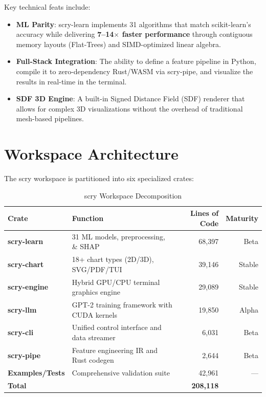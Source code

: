 \documentclass[11pt,a4paper]{article}
\begin{document}
Key technical feats include:
\begin{itemize}
    \item \textbf{ML Parity}: scry-learn implements 31 algorithms that match scikit-learn's accuracy while delivering \textbf{7--14$\times$ faster performance} through contiguous memory layouts (Flat-Trees) and SIMD-optimized linear algebra.
    \item \textbf{Full-Stack Integration}: The ability to define a feature pipeline in Python, compile it to zero-dependency Rust/WASM via scry-pipe, and visualize the results in real-time in the terminal.
    \item \textbf{SDF 3D Engine}: A built-in Signed Distance Field (SDF) renderer that allows for complex 3D visualizations without the overhead of traditional mesh-based pipelines.
\end{itemize}

\section{Workspace Architecture}

The scry workspace is partitioned into six specialized crates:

\begin{table}[H]
\centering
\caption{scry Workspace Decomposition}
\label{tab:crates}
\begin{tabularx}{\textwidth}{lXrr}
\toprule
\textbf{Crate} & \textbf{Function} & \textbf{Lines of Code} & \textbf{Maturity} \\
\midrule
\textbf{scry-learn} & 31 ML models, preprocessing, \& SHAP & 68,397 & Beta \\
\textbf{scry-chart} & 18+ chart types (2D/3D), SVG/PDF/TUI & 39,146 & Stable \\
\textbf{scry-engine} & Hybrid GPU/CPU terminal graphics engine & 29,089 & Stable \\
\textbf{scry-llm} & GPT-2 training framework with CUDA kernels & 19,850 & Alpha \\
\textbf{scry-cli} & Unified control interface and data streamer & 6,031 & Beta \\
\textbf{scry-pipe} & Feature engineering IR and Rust codegen & 2,644 & Beta \\
\textbf{Examples/Tests} & Comprehensive validation suite & 42,961 & --- \\
\midrule
\textbf{Total} & & \textbf{208,118} & \\
\bottomrule
\end{tabularx}
\end{table}
\end{document}
